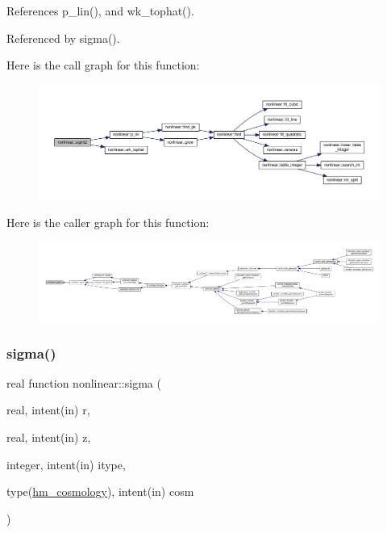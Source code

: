 References p\+\_\+lin(), and wk\+\_\+tophat().



Referenced by sigma().

Here is the call graph for this function\+:
\nopagebreak
\begin{figure}[H]
\begin{center}
\leavevmode
\includegraphics[width=350pt]{namespacenonlinear_a7f3d1c8e1e8b16f59cf8a1d0b6cd5499_cgraph}
\end{center}
\end{figure}
Here is the caller graph for this function\+:
\nopagebreak
\begin{figure}[H]
\begin{center}
\leavevmode
\includegraphics[width=350pt]{namespacenonlinear_a7f3d1c8e1e8b16f59cf8a1d0b6cd5499_icgraph}
\end{center}
\end{figure}
\mbox{\label{namespacenonlinear_a5ecb478e809d6e8e185d11dea143cd69}} 
\subsubsection{\texorpdfstring{sigma()}{sigma()}}
{\footnotesize\ttfamily real function nonlinear\+::sigma (\begin{DoxyParamCaption}\item[{real, intent(in)}]{r,  }\item[{real, intent(in)}]{z,  }\item[{integer, intent(in)}]{itype,  }\item[{type(\mbox{\hyperlink{structnonlinear_1_1hm__cosmology}{hm\+\_\+cosmology}}), intent(in)}]{cosm }\end{DoxyParamCaption})\hspace{0.3cm}{\ttfamily [private]}}



